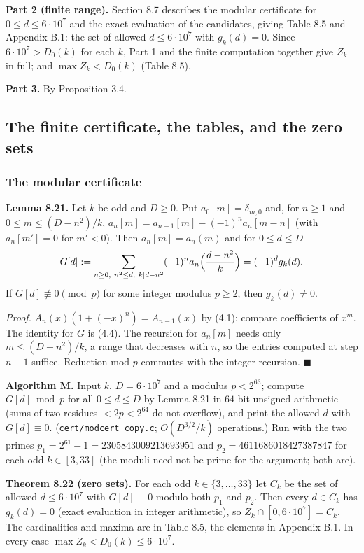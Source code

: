 \textbf{Part 2 (finite range).} Section 8.7 describes the modular certificate for \(0\le d\le6\cdot10^7\) and the exact evaluation of the candidates, giving Table 8.5 and Appendix B.1: the set of allowed \(d\le6\cdot10^7\) with \(g_k(d)=0\). Since \(6\cdot10^7>D_0(k)\) for each \(k\), Part 1 and the finite computation together give \(Z_k\) in full; and \(\max Z_k<D_0(k)\) (Table 8.5).

\textbf{Part 3.} By Proposition 3.4.

\subsection{The finite certificate, the tables, and the zero sets}\label{the-finite-certificate-the-tables-and-the-zero-sets}

\subsubsection{The modular certificate}\label{the-modular-certificate}

\textbf{Lemma 8.21.} Let \(k\) be odd and \(D\ge0\). Put \(a_0[m]=\delta_{m,0}\) and, for \(n\ge1\) and \(0\le m\le(D-n^2)/k\), \(a_n[m]=a_{n-1}[m]-(-1)^na_n[m-n]\) (with \(a_n[m']=0\) for \(m'<0\)). Then \(a_n[m]=a_n(m)\) and for \(0\le d\le D\)
\[G[d]:=\sum_{n\ge0,\ n^2\le d,\ k\mid d-n^2}(-1)^na_n\Bigl(\frac{d-n^2}k\Bigr)=(-1)^dg_k(d).\]
If \(G[d]\not\equiv0\pmod p\) for some integer modulus \(p\ge2\), then \(g_k(d)\ne0\).

\emph{Proof.} \(A_n(x)(1+(-x)^n)=A_{n-1}(x)\) by (4.1); compare coefficients of \(x^m\). The identity for \(G\) is (4.4). The recursion for \(a_n[m]\) needs only \(m\le(D-n^2)/k\), a range that decreases with \(n\), so the entries computed at step \(n-1\) suffice. Reduction mod \(p\) commutes with the integer recursion. \(\blacksquare\)

\textbf{Algorithm M.} Input \(k\), \(D=6\cdot10^7\) and a modulus \(p<2^{63}\); compute \(G[d]\bmod p\) for all \(0\le d\le D\) by Lemma 8.21 in \(64\)-bit unsigned arithmetic (sums of two residues \(<2p<2^{64}\) do not overflow), and print the allowed \(d\) with \(G[d]\equiv0\). (\texttt{cert/modcert\_copy.c}; \(O(D^{3/2}/k)\) operations.) Run with the two primes \(p_1=2^{61}-1=2305843009213693951\) and \(p_2=4611686018427387847\) for each odd \(k\in[3,33]\) (the moduli need not be prime for the argument; both are).

\textbf{Theorem 8.22 (zero sets).} For each odd \(k\in\{3,\dots,33\}\) let \(C_k\) be the set of allowed \(d\le6\cdot10^7\) with \(G[d]\equiv0\) modulo both \(p_1\) and \(p_2\). Then every \(d\in C_k\) has \(g_k(d)=0\) (exact evaluation in integer arithmetic), so \(Z_k\cap[0,6\cdot10^7]=C_k\). The cardinalities and maxima are in Table 8.5, the elements in Appendix B.1. In every case \(\max Z_k<D_0(k)\le6\cdot10^7\).

